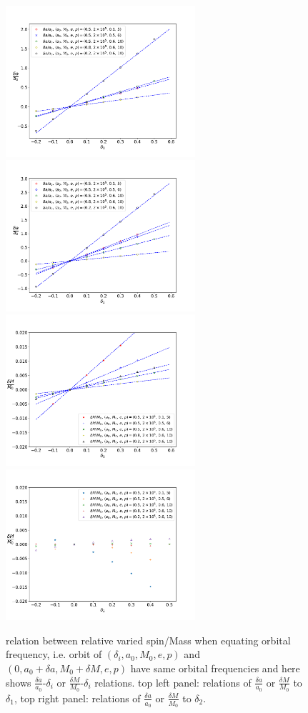 \documentclass{article}
\begin{document}
\begin{figure}[!ht]
	\centering
	\includegraphics[width=7cm]{d1_spin_linear.pdf}
	\includegraphics[width=7cm]{d2_spin_linear.pdf}
	\includegraphics[width=7cm]{d1_M.pdf}
	\includegraphics[width=7cm]{d2_M.pdf}
	\caption{relation between relative varied spin/Mass when equating orbital frequency, i.e. orbit of $(\delta_i, a_0, M_0,e,p)$ and $(0,a_0+\delta a, M_0+\delta M,e,p)$ have same orbital frequencies and here shows $\frac{\delta a}{a_0}$-$\delta_i$ or $\frac{\delta M}{M_0}$-$\delta_i$ relations. top left panel: relations of $\frac{\delta a}{a_0}$ or $\frac{\delta M}{M_0}$ to $\delta_1$, top right panel: relations of $\frac{\delta a}{a_0}$ or $\frac{\delta M}{M_0}$ to $\delta_2$.}
	\label{da_linear}
\end{figure}
\end{document}
